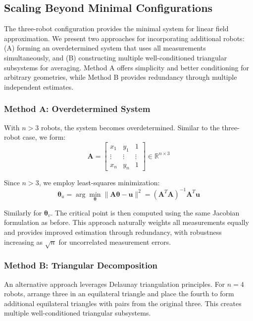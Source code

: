 \documentclass[lettersize,journal]{IEEEtran}
\begin{document}
\subsection{Scaling Beyond Minimal Configurations}

The three-robot configuration provides the minimal system for linear field approximation. We present two approaches for incorporating additional robots: (A) forming an overdetermined system that uses all measurements simultaneously, and (B) constructing multiple well-conditioned triangular subsystems for averaging. Method A offers simplicity and better conditioning for arbitrary geometries, while Method B provides redundancy through multiple independent estimates.

\subsubsection{Method A: Overdetermined System}

With $n > 3$ robots, the system becomes overdetermined. Similar to the three-robot case, we form:
\begin{equation}
\mathbf{A} = \begin{bmatrix} x_1 & y_1 & 1 \\ \vdots & \vdots & \vdots \\ x_n & y_n & 1 \end{bmatrix} \in \mathbb{R}^{n \times 3}
\end{equation}

Since $n > 3$, we employ least-squares minimization:
\begin{equation}
\boldsymbol{\theta}_u = \arg\min_{\boldsymbol{\theta}} \|\mathbf{A}\boldsymbol{\theta} - \mathbf{u}\|^2 = (\mathbf{A}^T\mathbf{A})^{-1}\mathbf{A}^T\mathbf{u}
\end{equation}

Similarly for $\boldsymbol{\theta}_v$. The critical point is then computed using the same Jacobian formulation as before. This approach naturally weights all measurements equally and provides improved estimation through redundancy, with robustness increasing as $\sqrt{n}$ for uncorrelated measurement errors.

\subsubsection{Method B: Triangular Decomposition}

An alternative approach leverages Delaunay triangulation principles. For $n = 4$ robots, arrange three in an equilateral triangle and place the fourth to form additional equilateral triangles with pairs from the original three. This creates multiple well-conditioned triangular subsystems.
\end{document}
